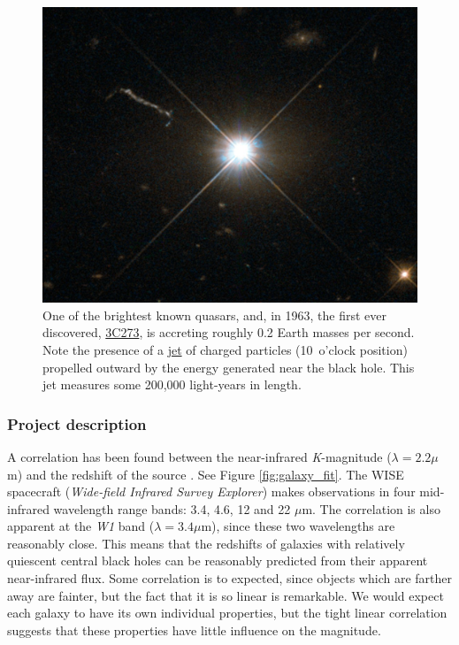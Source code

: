 \documentclass[11pt,a4paper]{report}
\begin{document}
	\begin{figure}[h!]
		\centering
		\includegraphics[scale=0.2]{3C273.jpg}
		\caption[3C273, one of the brightest known quasars]{{\small One of the brightest known
				quasars, and, in 1963, the first ever discovered,  \href{https://www.spacetelescope.org/images/potw1346a/}{3C273}, is
				accreting roughly 0.2 Earth masses per second. Note the presence of a
				\href{https://ned.ipac.caltech.edu/level5/March02/Courvoisier/Cour6.html}{jet}
				of charged particles (10~o'clock position) propelled outward by the energy
				generated near the black hole. This jet measures some 200,000 light-years in
				length.}}
		\label{fig:3C273}
	\end{figure}
	
	

	\subsubsection*{Project description}
	
	A correlation has been found between the near-infrared \textit{K}-magnitude ($\lambda = 2.2 \mu$m) and the redshift of the source \cite{glowacki}. See Figure \ref{fig:galaxy_fit}.
	The WISE spacecraft (\textit{Wide-field Infrared Survey Explorer}) makes observations in four mid-infrared wavelength range bands: 3.4, 4.6, 12 and 22 $\mu$m. The correlation is also apparent at the \textit{W1} band ($\lambda
	= 3.4 \mu$m), since these two wavelengths are reasonably close. This means that the redshifts of galaxies with relatively quiescent central black holes can be reasonably predicted from their apparent near-infrared flux. Some correlation is to expected, since objects which are farther away are fainter, but the fact that it is so linear is remarkable. We would expect each galaxy to have its own individual properties, but the tight linear correlation suggests that these properties have little influence on the magnitude.\\
	
\end{document}
